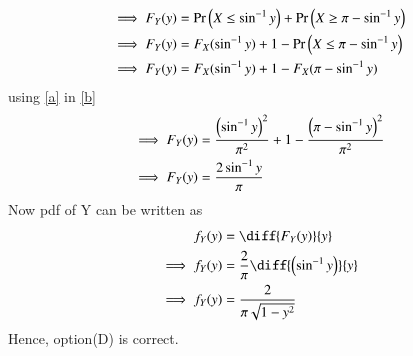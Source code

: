 \documentclass[journal,12pt,twocolumn]{IEEEtran}
\begin{document}
\begin{align}
    \implies F_Y(y) &= \Pr\left(X\leq \sin^{-1}{y}\right)+\Pr\left(X\geq \pi-\sin^{-1}{y}\right)\\
    \implies F_Y(y) &= F_X(\sin^{-1}{y})+1-\Pr\left(X\leq \pi-\sin^{-1}{y}\right)\\
    \implies F_Y(y) &= F_X(\sin^{-1}{y})+1-F_X(\pi-\sin^{-1}{y})
    \label{b}
\end{align}
using \eqref{a} in \eqref{b}
\begin{align}
    \implies F_Y(y) &= \frac{\left(\sin^{-1}{y}\right)^2}{\pi^2}+1-\frac{\left(\pi-\sin^{-1}{y}\right)^2}{\pi^2}\\
    \implies F_Y(y) &= \frac{2\sin^{-1}{y}}{\pi}
\end{align}
Now pdf of Y can be written as
\begin{align}
     f_Y(y) &= \diff{F_Y(y)}{y}\\
    \implies f_Y(y) &= \frac{2}{\pi}\diff{\brak{\sin^{-1}{y}}}{y}\\
    \implies f_Y(y) &= \frac{2}{\pi\sqrt{1-y^2}}
\end{align}
Hence, option(D) is correct.
\end{document}
